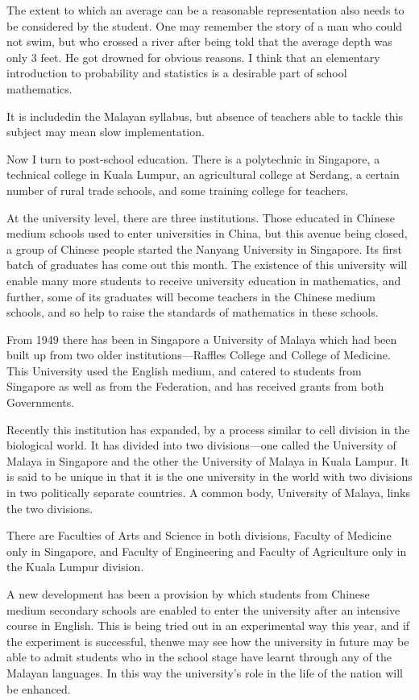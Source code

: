 The extent to which an average can be a reasonable representation also
needs to be considered by the student. One may remember the story of a
man who could not swim, but who crossed a river after being told that
the average depth was only 3 feet. He got drowned for obvious
reasons. I think that an elementary introduction to probability and
statistics is a desirable part of school mathematics.

It is included\pageoriginale in the Malayan syllabus, but absence of teachers able
to tackle this subject may mean slow implementation.

Now I turn to post-school education. There is a polytechnic in
Singapore, a technical college in Kuala Lumpur, an agricultural
college at Serdang, a certain number of rural trade schools, and some
training college for teachers.

At the university level, there are three institutions. Those educated
in Chinese medium schools used to enter universities in China, but
this avenue being closed, a group of Chinese people started the
Nanyang University in Singapore. Its first batch of graduates has come
out this month. The existence of this university will enable many more
students to receive university education in mathematics, and
further, some of its graduates will become teachers in the Chinese
medium schools, and so help to raise the standards of mathematics in
these schools.

From 1949 there has been in Singapore a University of Malaya which had
been built up from two older institutions---Raffles College and
College of Medicine. This University used the English medium, and
catered to students from Singapore as well as from the Federation, and
has received grants from both Governments.

Recently this institution has expanded, by a process similar to cell
division in the biological world. It has divided into two
divisions---one called the University of Malaya in Singapore and the
other the University of Malaya in Kuala Lampur. It is said to be
unique in that it is the one university in the world with two
divisions in two politically separate countries. A common body,
University of Malaya, links the two divisions.

There are Faculties of Arts and Science in both divisions, Faculty of
Medicine only in Singapore, and Faculty of Engineering and Faculty of
Agriculture only in the Kuala Lumpur division. 

A new development has been a provision by which students from Chinese
medium secondary schools are enabled to enter the university after an
intensive course in English. This is being tried out in an
experimental way this year, and if the experiment is successful,
then\pageoriginale we may see how the university in future may be able
to admit students who in the school stage have learnt through any of
the Malayan languages. In this way the university's role in the life
of the nation will be enhanced.

